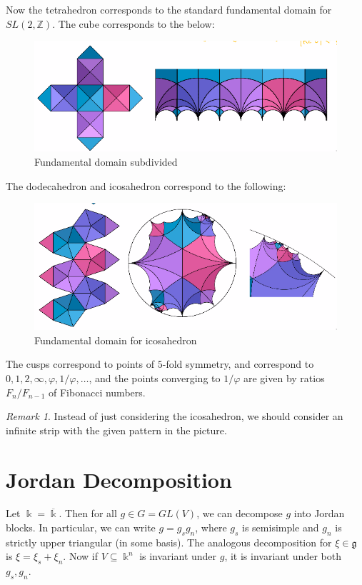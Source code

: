\documentclass[leqno, openany]{memoir}
\theoremstyle{definition}
\theoremstyle{remark}
\newtheorem{rmk}[thm]{Remark}
\theoremstyle{plain}
\theoremstyle{definition}
\theoremstyle{remark}
\newcommand{\Z}{\mathbb{Z}}
\renewcommand{\k}{\Bbbk}
\newcommand{\mf}[1]{\mathfrak{#1}}
\newcommand{\ol}[1]{\overline{#1}}
\begin{document}
Now the tetrahedron corresponds to the standard fundamental domain for $SL(2,
\Z)$. The cube corresponds to the below: \begin{figure}[H] \centering
    \includegraphics[width=0.8\linewidth]{squarefd} \caption{Fundamental domain
    subdivided}%
    \label{fig:squarefd} 
\end{figure} The dodecahedron and
    icosahedron correspond to the following: 
    \begin{figure}[H] \centering
        \includegraphics[width=0.8\linewidth]{icosafd} \caption{Fundamental
        domain for icosahedron}%
        \label{fig:icosafd} 
    \end{figure} The cusps
        correspond to points of $5$-fold symmetry, and correspond to $0, 1, 2,
        \infty, \varphi, 1/\varphi, \ldots$, and the points converging to
        $1/\varphi$ are given by ratios $F_n/F_{n-1}$ of Fibonacci numbers.

\begin{rmk} Instead of just considering the icosahedron, we should consider an
infinite strip with the given pattern in the picture.  \end{rmk}

\section{Jordan Decomposition}%

Let $\k = \ol{\k}$. Then for all $g \in G = GL(V)$, we can decompose $g$ into
Jordan blocks. In particular, we can write $g = g_s g_n$, where $g_s$ is
semisimple and $g_n$ is strictly upper triangular (in some basis). The
analogous decomposition for $\xi \in \mf{g}$ is $\xi = \xi_s + \xi_n$. Now if
$V \subseteq \k^n$ is invariant under $g$, it is invariant under both $g_s,
g_n$.
\end{document}
